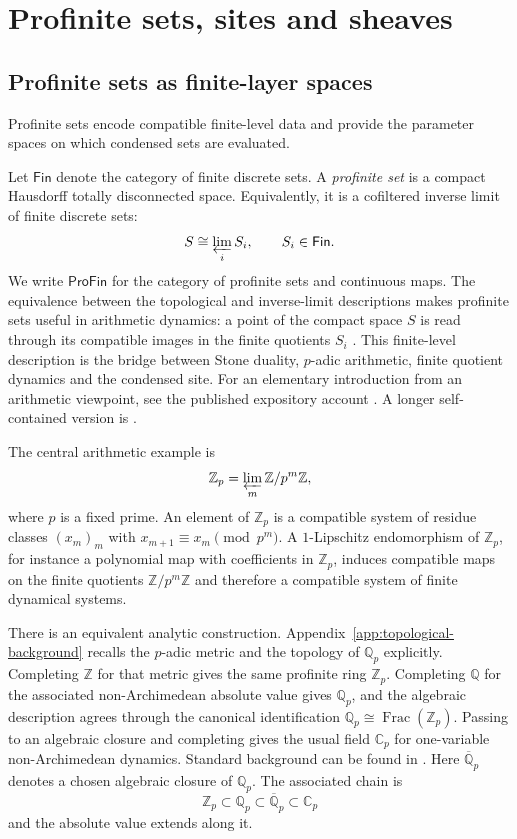 \documentclass[10pt]{amsart}
\newcommand{\ProFin}{\mathsf{ProFin}}
\newcommand{\Fin}{\mathsf{Fin}}
\newcommand{\Z}{\mathbb{Z}}
\newcommand{\Q}{\mathbb{Q}}
\newcommand{\Zp}{\mathbb{Z}_p}
\newcommand{\Qp}{\mathbb{Q}_p}
\newcommand{\Qpalg}{\overline{\Q}_p}
\newcommand{\Cp}{\mathbb{C}_p}
\theoremstyle{plain}
\theoremstyle{definition}
\begin{document}
\section{Profinite sets, sites and sheaves}
\label{sec:condensed}

\subsection{Profinite sets as finite-layer spaces}

Profinite sets encode compatible finite-level data and provide the parameter
spaces on which condensed sets are evaluated.

Let $\Fin$ denote the category of finite discrete sets.
A \emph{profinite set} is a compact Hausdorff totally disconnected space.
Equivalently, it is a cofiltered inverse limit of finite discrete sets:
\[
  S\cong\varprojlim_i S_i,
  \qquad S_i\in\Fin.
\]
We write $\ProFin$ for the category of profinite sets and continuous maps.
The equivalence between the topological and inverse-limit descriptions makes
profinite sets useful in arithmetic dynamics: a point of the compact space $S$
is read through its compatible images in the finite quotients $S_i$
\cite{JohnstoneStoneSpaces}. This finite-level description is the bridge between
Stone duality, $p$-adic arithmetic, finite quotient dynamics and the condensed
site.
For an elementary
introduction from an arithmetic viewpoint, see the published expository account
\cite{PerezBuendiaStoneGaceta}. A longer self-contained version is
\cite{PerezBuendiaStoneArxiv}.

The central arithmetic example is
\[
  \Zp=\varprojlim_m\Z/p^m\Z,
\]
where $p$ is a fixed prime. An element of $\Zp$ is a compatible system of
residue classes $(x_m)_m$ with
$x_{m+1}\equiv x_m\pmod {p^m}$.
A $1$-Lipschitz endomorphism of $\Zp$, for instance a polynomial map
with coefficients in $\Zp$, induces compatible maps on the finite quotients
$\Z/p^m\Z$ and therefore a compatible system of finite dynamical systems.

There is an equivalent analytic construction. Appendix~\ref{app:topological-background}
recalls the $p$-adic metric and the topology of $\Qp$ explicitly. Completing
$\Z$ for that metric gives the same profinite ring $\Zp$. Completing $\Q$ for
the associated non-Archimedean absolute value gives $\Qp$, and the algebraic
description agrees through the canonical identification
$\Qp\cong\operatorname{Frac}(\Zp)$. Passing to an algebraic closure and
completing gives the usual field $\Cp$ for one-variable non-Archimedean
dynamics. Standard background can be found in
\cite{GouveaPadic,SilvermanADS,BenedettoNAM}. Here $\Qpalg$ denotes a chosen
algebraic closure of $\Qp$. The
associated chain is
\[
  \Zp\subset \Qp\subset \Qpalg\subset \Cp
\]
and the absolute value extends along it.
\end{document}
